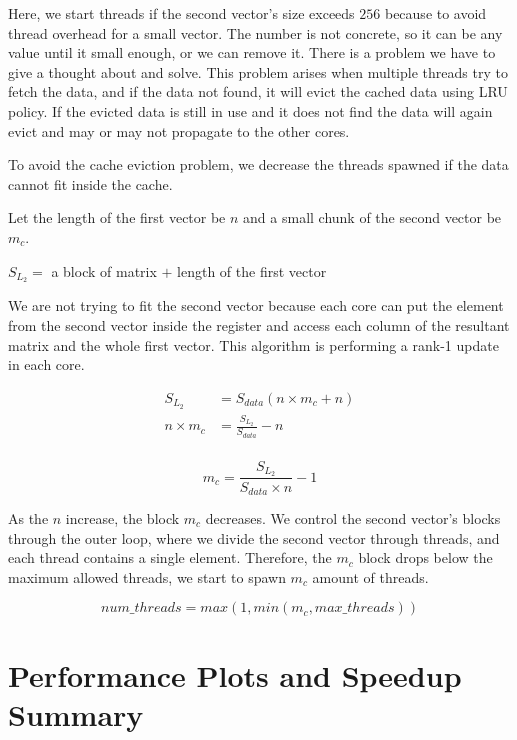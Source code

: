 Here, we start threads if the second vector's size exceeds $256$ because 
to avoid thread overhead for a small vector. The number is not concrete, 
so it can be any value until it small enough, or we can remove it. 
There is a problem we have to give a thought about and solve. 
This problem arises when multiple threads try to fetch the data, 
and if the data not found, it will evict the cached data using LRU policy. 
If the evicted data is still in use and it does not find the data will 
again evict and may or may not propagate to the other cores. 

To avoid the cache eviction problem, we decrease the threads spawned 
if the data cannot fit inside the cache.

Let the length of the first vector be $n$ and a small chunk of the second
vector be $m_c$.

$S_{L_2} = $ a block of matrix $+$ length of the first vector

We are not trying to fit the second vector because each core can 
put the element from the second vector inside the register and 
access each column of the resultant matrix and the whole first vector.
This algorithm is performing a rank-1 update in each core.

\begin{align*}
    S_{L_2} &= S_{data}(n \times m_c + n)\\
    n \times m_c &= \frac{S_{L_2}}{S_{data}} - n\\
\end{align*}

\begin{equation}
    m_c = \frac{S_{L_2}}{S_{data} \times n} - 1
    \label{eq:outer_block}
\end{equation}

As the $n$ increase, the block $m_c$ decreases. 
We control the second vector's blocks through the outer loop, 
where we divide the second vector through threads, and each 
thread contains a single element. Therefore, 
the $m_c$ block drops below the maximum allowed threads, 
we start to spawn $m_c$ amount of threads.

\begin{equation}
    num\_threads = max(1, min(m_c,max\_threads)) 
    \label{eq:outer_num_threads}
\end{equation}

\clearpage
\section{Performance Plots and Speedup Summary}


